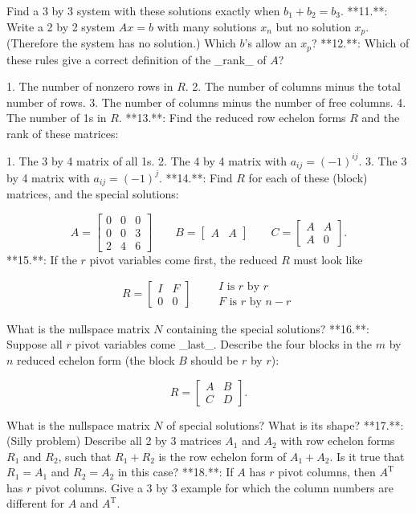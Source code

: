 Find a 3 by 3 system with these solutions exactly when \(b_{1}+b_{2}=b_{3}\).
**11.**: Write a 2 by 2 system \(Ax=b\) with many solutions \(x_{n}\) but no solution \(x_{p}\). (Therefore the system has no solution.) Which \(b\)'s allow an \(x_{p}\)?
**12.**: Which of these rules give a correct definition of the _rank_ of \(A\)?

1. The number of nonzero rows in \(R\).
2. The number of columns minus the total number of rows.
3. The number of columns minus the number of free columns.
4. The number of 1s in \(R\).
**13.**: Find the reduced row echelon forms \(R\) and the rank of these matrices:

1. The 3 by 4 matrix of all 1s.
2. The 4 by 4 matrix with \(a_{ij}=(-1)^{ij}\).
3. The 3 by 4 matrix with \(a_{ij}=(-1)^{j}\).
**14.**: Find \(R\) for each of these (block) matrices, and the special solutions:

\[A=\begin{bmatrix}0&0&0\\ 0&0&3\\ 2&4&6\end{bmatrix}\qquad B=\begin{bmatrix}A&A\end{bmatrix}\qquad C=\begin{bmatrix} A&A\\ A&0\end{bmatrix}.\]
**15.**: If the \(r\) pivot variables come first, the reduced \(R\) must look like

\[R=\begin{bmatrix}I&F\\ 0&0\end{bmatrix}\qquad\begin{array}{l}I\text{ is $r$ by $r$}\\ \text{$F$ is $r$ by $n-r$}\end{array}\]

What is the nullspace matrix \(N\) containing the special solutions?
**16.**: Suppose all \(r\) pivot variables come _last_. Describe the four blocks in the \(m\) by \(n\) reduced echelon form (the block \(B\) should be \(r\) by \(r\)):

\[R=\begin{bmatrix}A&B\\ C&D\end{bmatrix}.\]

What is the nullspace matrix \(N\) of special solutions? What is its shape?
**17.**: (Silly problem) Describe all 2 by 3 matrices \(A_{1}\) and \(A_{2}\) with row echelon forms \(R_{1}\) and \(R_{2}\), such that \(R_{1}+R_{2}\) is the row echelon form of \(A_{1}+A_{2}\). Is it true that \(R_{1}=A_{1}\) and \(R_{2}=A_{2}\) in this case?
**18.**: If \(A\) has \(r\) pivot columns, then \(A^{\mathrm{T}}\) has \(r\) pivot columns. Give a 3 by 3 example for which the column numbers are different for \(A\) and \(A^{\mathrm{T}}\).

 